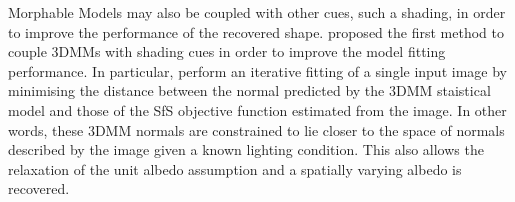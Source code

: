 Morphable Models may also be coupled with other cues, such a shading,
in order to improve the performance of the recovered shape.
\citet{patel2012driving} proposed the first method to couple 3DMMs with shading
cues in order to improve the model fitting performance.
In particular, \citet{patel2012driving} perform an iterative fitting of a
single input image by minimising the distance between the normal predicted
by the 3DMM staistical model and those of the SfS objective function
estimated from the image. In other words, these 3DMM normals are constrained
to lie closer to the space of normals described by the image given a known
lighting condition. This also allows the relaxation of the unit albedo assumption
and a spatially varying albedo is recovered.
